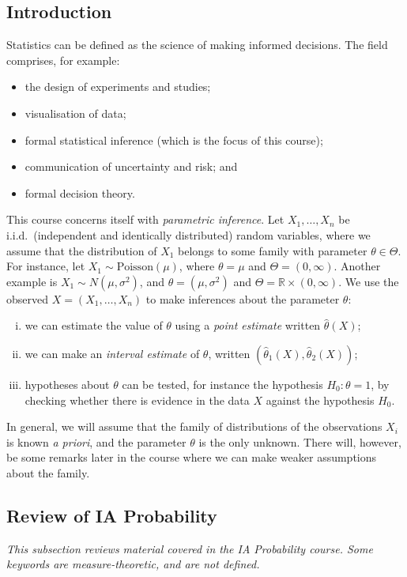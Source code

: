 \subsection{Introduction}
Statistics can be defined as the science of making informed decisions.
The field comprises, for example:
\begin{itemize}
	\item the design of experiments and studies;
	\item visualisation of data;
	\item formal statistical inference (which is the focus of this course);
	\item communication of uncertainty and risk; and
	\item formal decision theory.
\end{itemize}
This course concerns itself with \textit{parametric inference}.
Let \( X_1, \dots, X_n \) be i.i.d.\ (independent and identically distributed) random variables, where we assume that the distribution of \( X_1 \) belongs to some family with parameter \( \theta \in \Theta \).
For instance, let \( X_1 \sim \mathrm{Poisson}(\mu) \), where \( \theta = \mu \) and \( \Theta = (0, \infty) \).
Another example is \( X_1 \sim N(\mu, \sigma^2) \), and \( \theta = (\mu, \sigma^2) \) and \( \Theta = \mathbb R \times (0, \infty) \).
We use the observed \( X = (X_1, \dots, X_n) \) to make inferences about the parameter \( \theta \):
\begin{enumerate}[(i)]
	\item we can estimate the value of \( \theta \) using a \textit{point estimate} written \( \hat \theta(X) \);
	\item we can make an \textit{interval estimate} of \( \theta \), written \( (\hat \theta_1(X), \hat \theta_2(X)) \);
	\item hypotheses about \( \theta \) can be tested, for instance the hypothesis \( H_0 \colon \theta = 1 \), by checking whether there is evidence in the data \( X \) against the hypothesis \( H_0 \).
\end{enumerate}
\begin{remark}
	In general, we will assume that the family of distributions of the observations \( X_i \) is known \textit{a priori}, and the parameter \( \theta \) is the only unknown.
	There will, however, be some remarks later in the course where we can make weaker assumptions about the family.
\end{remark}

\subsection{Review of IA Probability}
\textit{This subsection reviews material covered in the IA Probability course. Some keywords are measure-theoretic, and are not defined.}

